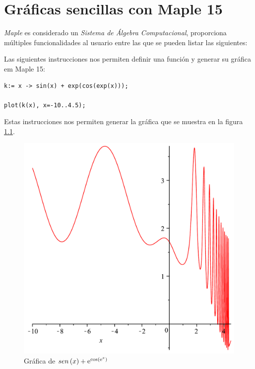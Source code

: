 
\chapter{Gráficas sencillas con Maple 15}
\begin{bibunit}[plain]

\emph{Maple} es considerado un \emph{Sistema de Álgebra Computacional}, proporciona múltiples
funcionalidades al usuario entre las que se pueden listar las siguientes:

Las siguientes instrucciones nos permiten definir una función y generar su gráfica 
em Maple 15:

\begin{verbatim}
k:= x -> sin(x) + exp(cos(exp(x)));

plot(k(x), x=-10..4.5);
\end{verbatim}

Estas instrucciones nos permiten generar la gráfica que se muestra en la figura \ref{cap1f1}.

\begin{figure}[h!]
\centering
\includegraphics[scale=0.45]{grafica01}
\caption{Gráfica de $sen \left( x \right) +{{\rm e}^{\cos \left( {{\rm e}^{x}} \right) }}$}\label{cap1f1}
\end{figure}


\end{bibunit}

